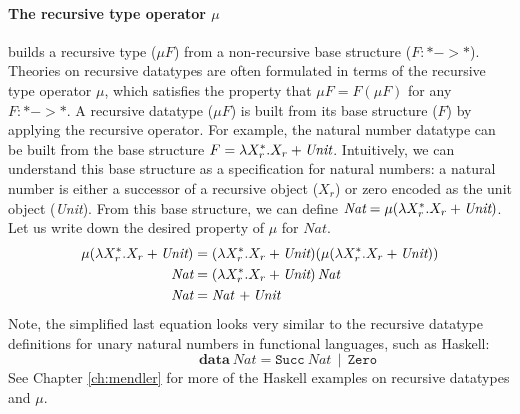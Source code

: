 \paragraph{The recursive type operator $\mu$} builds a recursive type
($\mu F$) from a non-recursive base structure ($F:* -> *$).
Theories on recursive datatypes are often formulated in terms of
the recursive type operator $\mu$, which satisfies the property
that $\mu F = F (\mu F)$ for any $F: * -> *$. A recursive datatype ($\mu F$)
is built from its base structure ($F$) by applying the recursive operator.
For example, the natural number datatype can be built from the base structure
$F = \lambda X_r^{*}.X_r + \textit{Unit}$. Intuitively, we can understand this
base structure as a specification for natural numbers: a natural number is
either a successor of a recursive object ($X_r$)
or zero encoded as the unit object (\textit{Unit}).
From this base structure, we can define
$\textit{Nat} = \mu(\lambda X_r^{*}.X_r + \textit{Unit})$.
Let us write down the desired property of $\mu$ for $\textit{Nat}$.
\begin{align*}
\mu(\lambda X_r^{*}.X_r + \textit{Unit}) &=
(\lambda X_r^{*}.X_r + \textit{Unit})(\mu(\lambda X_r^{*}.X_r + \textit{Unit})) \\
\textit{Nat} &= (\lambda X_r^{*}.X_r + \textit{Unit})\,\textit{Nat} \\
\textit{Nat} &= \textit{Nat}\, + \textit{Unit}
\end{align*}
Note, the simplified last equation looks very similar to
the recursive datatype definitions for unary natural numbers
in functional languages, such as Haskell: \[ \qquad\qquad
\textbf{data}~\textit{Nat} = \texttt{Succ}~\textit{Nat}\,\mid\,\texttt{Zero} \]
See Chapter \ref{ch:mendler}
for more of the Haskell examples on recursive datatypes and $\mu$.

